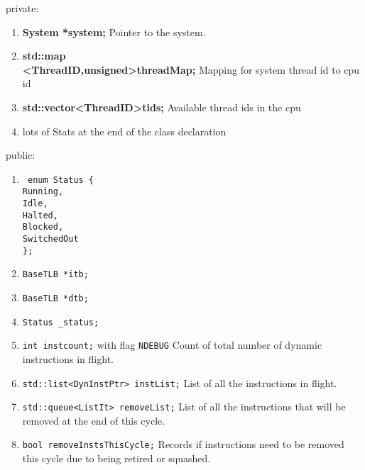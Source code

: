 \documentclass[11pt]{article}
\begin{document}
\begin{enumerate}
\begin{enumerate}[label={\arabic*.}]
			\end{enumerate}
			
		private:
		\begin{enumerate}[label={\arabic*.}]
			\item \textbf{System *system;} Pointer to the system.
			\item \textbf{std::map\\\textless ThreadID,unsigned\textgreater threadMap;} Mapping for system thread id to cpu id
			\item \textbf{std::vector\textless ThreadID\textgreater tids;} Available thread ids in the cpu
			\item lots of Stats at the end of the class declaration
		\end{enumerate}
			
			
		public:
			\begin{enumerate}[label={\arabic*.}]
				\item \texttt{    enum Status \{\\
        						\-\hspace{1cm}	Running,\\
        						\-\hspace{1cm}	Idle,\\
        						\-\hspace{1cm}	Halted,\\
        						\-\hspace{1cm}	Blocked,\\
        						\-\hspace{1cm}	SwitchedOut\\
    												\};}
    		\item \texttt{BaseTLB *itb;}
    		\item \texttt{BaseTLB *dtb;}
    		\item \texttt{Status \_status;}
    		\item \texttt{int instcount;} with flag \texttt{NDEBUG} Count of total number of dynamic instructions in flight.
    		\item \texttt{std::list<DynInstPtr> instList;} List of all the instructions in flight.
    		\item \texttt{std::queue<ListIt> removeList;} List of all the instructions that will be removed at the end of this cycle.
    		\item \texttt{bool removeInstsThisCycle;} Records if instructions need to be removed this cycle due to being retired or squashed.
			\end{enumerate}
	\end{enumerate}
\end{document}
